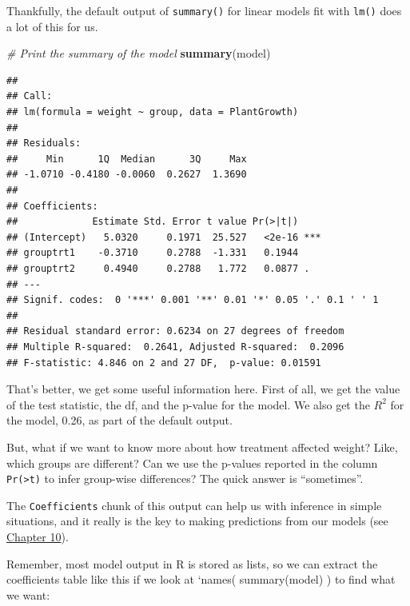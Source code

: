 \documentclass[
]{book}
\newenvironment{Shaded}{\begin{snugshade}}{\end{snugshade}}
\newcommand{\CommentTok}[1]{\textcolor[rgb]{0.56,0.35,0.01}{\textit{#1}}}
\newcommand{\KeywordTok}[1]{\textcolor[rgb]{0.13,0.29,0.53}{\textbf{#1}}}
\newcommand{\NormalTok}[1]{#1}
\newcommand{\OperatorTok}[1]{\textcolor[rgb]{0.81,0.36,0.00}{\textbf{#1}}}
\newcommand{\StringTok}[1]{\textcolor[rgb]{0.31,0.60,0.02}{#1}}
\begin{document}
Thankfully, the default output of \texttt{summary()} for linear models fit with \texttt{lm()} does a lot of this for us.

\begin{Shaded}
\begin{Highlighting}[]
\CommentTok{# Print the summary of the model}
\KeywordTok{summary}\NormalTok{(model)}
\end{Highlighting}
\end{Shaded}

\begin{verbatim}
## 
## Call:
## lm(formula = weight ~ group, data = PlantGrowth)
## 
## Residuals:
##     Min      1Q  Median      3Q     Max 
## -1.0710 -0.4180 -0.0060  0.2627  1.3690 
## 
## Coefficients:
##             Estimate Std. Error t value Pr(>|t|)    
## (Intercept)   5.0320     0.1971  25.527   <2e-16 ***
## grouptrt1    -0.3710     0.2788  -1.331   0.1944    
## grouptrt2     0.4940     0.2788   1.772   0.0877 .  
## ---
## Signif. codes:  0 '***' 0.001 '**' 0.01 '*' 0.05 '.' 0.1 ' ' 1
## 
## Residual standard error: 0.6234 on 27 degrees of freedom
## Multiple R-squared:  0.2641,	Adjusted R-squared:  0.2096 
## F-statistic: 4.846 on 2 and 27 DF,  p-value: 0.01591
\end{verbatim}

That's better, we get some useful information here. First of all, we get the value of the test statistic, the df, and the p-value for the model. We also get the \(R^2\) for the model, 0.26, as part of the default output.

But, what if we want to know more about how treatment affected weight? Like, which groups are different? Can we use the p-values reported in the column \texttt{Pr(\textgreater{}\textbar{}t\textbar{})} to infer group-wise differences? The quick answer is ``sometimes''.

The \texttt{Coefficients} chunk of this output can help us with inference in simple situations, and it really is the key to making predictions from our models (see \protect\hyperlink{Chapter10}{Chapter 10}).

Remember, most model output in R is stored as lists, so we can extract the coefficients table like this if we look at `names( summary(model) ) to find what we want:

\begin{Shaded}
\end{Shaded}
\end{document}
